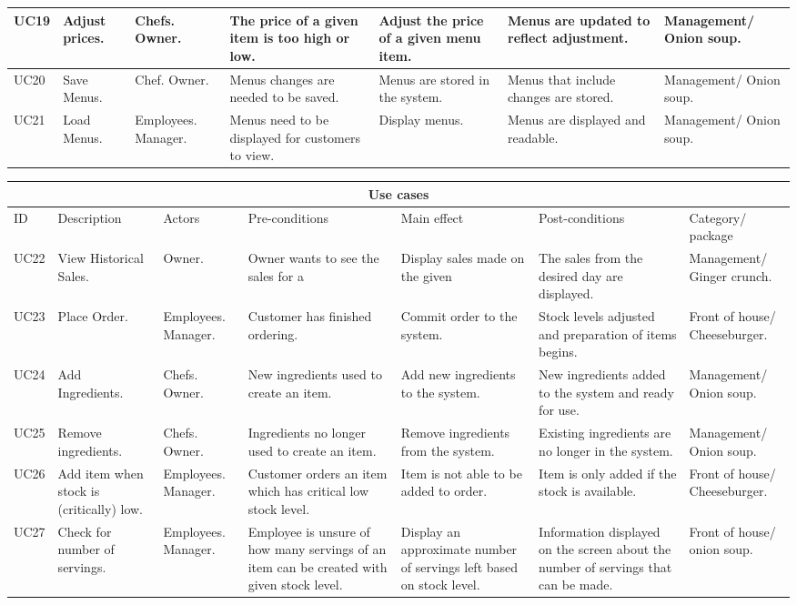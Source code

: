 \begin{tabularx}{\linewidth}{|X|X|X|X|X|X|X|}
\hline
UC19 & Adjust prices. & Chefs. Owner. & The price of a given item is too high or low. & Adjust the price of a given menu item. & Menus are updated to reflect adjustment. & Management/ Onion soup. \\
\hline
UC20 & Save Menus. & Chef. Owner. & Menus changes are needed to be saved. & Menus are stored in the system. & Menus that include changes are stored. & Management/ Onion soup. \\
\hline
UC21 & Load Menus. & Employees. Manager. & Menus need to be displayed for customers to view. & Display menus. & Menus are displayed and readable. & Management/ Onion soup. \\
\hline
\end{tabularx}
\begin{tabularx}{\linewidth}{|X|X|X|X|X|X|X|}
\hline
\multicolumn{7}{c}{ Use cases } \\
\hline
ID & Description & Actors & Pre-conditions & Main effect & Post-conditions & Category/ package \\
\hline
UC22 & View Historical Sales. & Owner. & Owner wants to see the sales for a & Display sales made on the given & The sales from the desired day are displayed. & Management/ Ginger crunch. \\
\hline
UC23 & Place Order. & Employees. Manager. & Customer has finished ordering. & Commit order to the system. & Stock levels adjusted and preparation of items begins. & Front of house/ Cheeseburger. \\
\hline
UC24 & Add Ingredients. & Chefs. Owner. & New ingredients used to create an item. & Add new ingredients to the system. & New ingredients added to the system and ready for use. & Management/ Onion soup. \\
\hline 
UC25 & Remove ingredients. & Chefs. Owner. & Ingredients no longer used to create an item. & Remove ingredients from the system. & Existing ingredients are no longer in the system. & Management/ Onion soup. \\
\hline
UC26 & Add item when stock is (critically) low. & Employees. Manager. & Customer orders an item which has critical low stock level. & Item is not able to be added to order. & Item is only added if the stock is available. & Front of house/ Cheeseburger. \\
\hline
UC27 & Check for number of servings. & Employees. Manager. & Employee is unsure of how many servings of an item can be created with given stock level. & Display an approximate number of servings left based on stock level. & Information displayed on the screen about the number of servings that can be made. & Front of house/ onion soup. \\

\end{tabularx}
